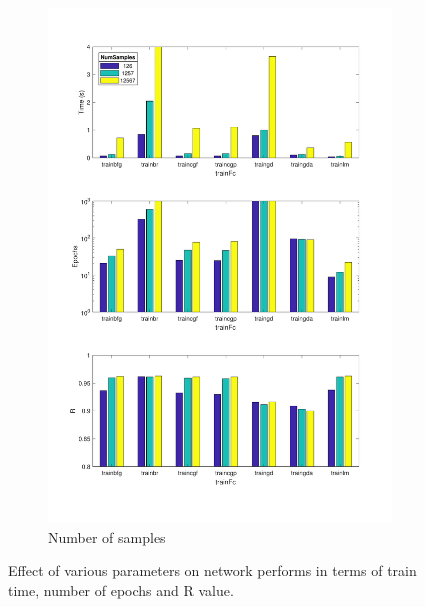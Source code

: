 \begin{landscape}
\begin{figure}[p]
\begin{subfigure}{0.37\linewidth}
            \includegraphics[width=\linewidth]{img/NumSamples.pdf}
            \caption{Number of samples}
        \end{subfigure}
        \caption{Effect of various parameters on network performs in terms of train time, number of epochs and R value.}
        \label{fig:results}
    \end{figure}
\end{landscape}